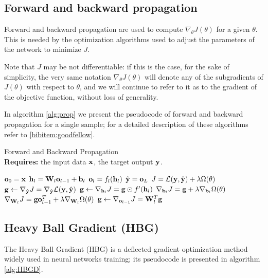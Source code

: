 \subsection{Forward and backward propagation}
Forward and backward propagation are used to compute $\nabla_\theta J(\theta)$ for a given $\theta$. This is needed by the optimization algorithms used to adjust the parameters of the network to minimize $J$.

Note that $J$ may be not differentiable: if this is the case, for the sake of simplicity, the very same notation $\nabla_\theta J(\theta)$ will denote any of the subgradients of $J(\theta)$ with respect to $\theta$, and we will continue to refer to it as to the gradient of the objective function, without loss of generality.

In algorithm \ref{alg:prop} we present the pseudocode of forward and backward propagation for a single sample; for a detailed description of these algorithms refer to \ref{bibitem:goodfellow}.

\begin{algorithm}[htbp]
    \caption{Forward and Backward Propagation\\
        \textbf{Requires:} the input data $\mathbf{x}$, the target output $\mathbf{y}$.
    }
    \label{alg:prop}
    \begin{algorithmic}
        \State $\mathbf{o}_0 = \mathbf{x}$
         
            \State $\mathbf{h}_l = \mathbf{W}_l\mathbf{o}_{l-1} + \mathbf{b}_l$
            \State $\mathbf{o}_l = f_l(\mathbf{h}_l)$
        \EndFor
        \State $\hat{\mathbf{y}} = \mathbf{o}_L$
        \State $J = \mathcal{L} (\mathbf{y}, \hat{\mathbf{y}}) + \lambda\Omega(\theta)$  \\
        \State $\mathbf{g} \gets \nabla_{\hat{\mathbf{y}}} J = \nabla_{\hat{\mathbf{y}}} \mathcal{L}(\mathbf{y}, \hat{\mathbf{y}})$ 
         
            \State $\mathbf{g} \gets \nabla_{\mathbf{h}_l} J = \mathbf{g} \odot f'(\mathbf{h}_l)$
            \State $\nabla_{\mathbf{b}_l} J = \mathbf{g} + \lambda \nabla_{\mathbf{b}_l}\Omega(\theta)$
            \State $\nabla_{\mathbf{W}_l} J = \mathbf{g} \mathbf{o}_{l-1}^T + \lambda \nabla_{\mathbf{W}_l}\Omega(\theta)$
            \State $\mathbf{g} \gets \nabla_{\mathbf{o}_{l-1}} J = \mathbf{W}_l^T \mathbf{g}$
        \EndFor
    \end{algorithmic}
\end{algorithm}

\subsection{Heavy Ball Gradient (HBG)}
The Heavy Ball Gradient (HBG) is a deflected gradient optimization method widely used in neural networks training; its pseudocode is presented in algorithm \ref{alg:HBGD}.

